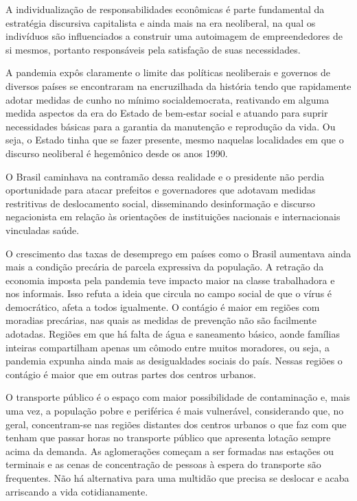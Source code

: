 A individualização de responsabilidades econômicas é parte fundamental
da estratégia discursiva capitalista e ainda mais na era neoliberal, na
qual os indivíduos são influenciados a construir uma autoimagem de
empreendedores de si mesmos, portanto responsáveis pela satisfação de
suas necessidades.

A pandemia expôs claramente o limite das políticas neoliberais e
governos de diversos países se encontraram na encruzilhada da história
tendo que rapidamente adotar medidas de cunho no mínimo socialdemocrata,
reativando em alguma medida aspectos da era do Estado de bem-estar
social e atuando para suprir necessidades básicas para a garantia da
manutenção e reprodução da vida. Ou seja, o Estado tinha que se fazer
presente, mesmo naquelas localidades em que o discurso neoliberal é
hegemônico desde os anos 1990.

O Brasil caminhava na contramão dessa realidade e o presidente não
perdia oportunidade para atacar prefeitos e governadores que adotavam
medidas restritivas de deslocamento social, disseminando desinformação e
discurso negacionista em relação às orientações de instituições
nacionais e internacionais vinculadas saúde.

O crescimento das taxas de desemprego em países como o Brasil aumentava
ainda mais a condição precária de parcela expressiva da população. A
retração da economia imposta pela pandemia teve impacto maior na classe
trabalhadora e nos informais. Isso refuta a ideia que circula no campo
social de que o vírus é democrático, afeta a todos igualmente. O
contágio é maior em regiões com moradias precárias, nas quais as medidas
de prevenção não são facilmente adotadas. Regiões em que há falta de
água e saneamento básico, aonde famílias inteiras compartilham apenas um
cômodo entre muitos moradores, ou seja, a pandemia expunha ainda mais as
desigualdades sociais do país. Nessas regiões o contágio é maior que em
outras partes dos centros urbanos.

O transporte público é o espaço com maior possibilidade de
contaminação e, mais uma vez, a população pobre e periférica é mais
vulnerável, considerando que, no geral, concentram-se nas regiões
distantes dos centros urbanos o que faz com que tenham que passar horas
no transporte público que apresenta lotação sempre acima da demanda. As
aglomerações começam a ser formadas nas estações ou terminais e as cenas
de concentração de pessoas à espera do transporte são frequentes. Não há
alternativa para uma multidão que precisa se deslocar e acaba arriscando
a vida cotidianamente.


